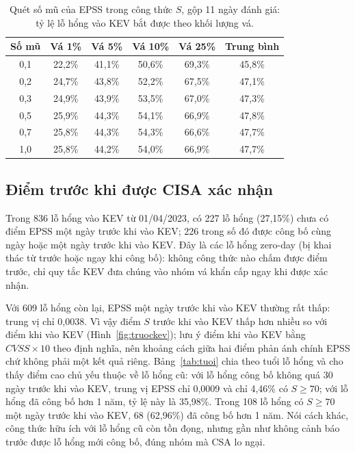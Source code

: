 \documentclass[runningheads]{llncs}
\begin{document}
\begin{table}
\centering
\caption{Quét số mũ của EPSS trong công thức $S$, gộp 11 ngày đánh giá: tỷ lệ lỗ hổng vào KEV bắt
được theo khối lượng vá.}\label{tab:somu}
\begin{tabular}{cccccc}
\toprule
Số mũ & Vá 1\% & Vá 5\% & Vá 10\% & Vá 25\% & Trung bình \\
\midrule
0,1 & 22,2\% & 41,1\% & 50,6\% & 69,3\% & 45,8\% \\
0,2 & 24,7\% & 43,8\% & 52,2\% & 67,5\% & 47,1\% \\
0,3 & 24,9\% & 43,9\% & 53,5\% & 67,0\% & 47,3\% \\
0,5 & 25,9\% & 44,3\% & 54,1\% & 66,9\% & 47,8\% \\
0,7 & 25,8\% & 44,3\% & 54,3\% & 66,6\% & 47,7\% \\
1,0 & 25,8\% & 44,2\% & 54,0\% & 66,9\% & 47,7\% \\
\bottomrule
\end{tabular}
\end{table}

\subsection{Điểm trước khi được CISA xác nhận}

Trong 836 lỗ hổng vào KEV từ 01/04/2023, có 227 lỗ hổng (27,15\%) chưa có điểm EPSS một ngày
trước khi vào KEV; 226 trong số đó được công bố cùng ngày hoặc một ngày trước khi vào KEV.
Đây là các lỗ hổng zero-day (bị khai thác từ trước hoặc ngay khi công bố): không công thức nào chấm được điểm trước, chỉ quy tắc KEV đưa
chúng vào nhóm vá khẩn cấp ngay khi được xác nhận.

Với 609 lỗ hổng còn lại, EPSS một ngày trước khi vào KEV thường rất thấp: trung vị chỉ 0,0038.
Vì vậy điểm $S$ trước khi vào KEV thấp hơn nhiều so với điểm khi vào KEV (Hình~\ref{fig:truockev});
lưu ý điểm khi vào KEV bằng $\mathit{CVSS} \times 10$ theo định nghĩa, nên khoảng cách giữa hai
điểm phản ánh chính EPSS chứ không phải một kết quả riêng. Bảng~\ref{tab:tuoi} chia theo tuổi
lỗ hổng và cho thấy điểm cao chủ yếu thuộc về lỗ hổng cũ: với lỗ hổng công bố không quá 30 ngày
trước khi vào KEV, trung vị EPSS chỉ 0,0009 và chỉ 4,46\% có $S \ge 70$; với lỗ hổng đã công bố
hơn 1 năm, tỷ lệ này là 35,98\%. Trong 108 lỗ hổng có $S \ge 70$ một ngày trước khi vào KEV, 68
(62,96\%) đã công bố hơn 1 năm. Nói cách khác, công thức hữu ích với lỗ hổng cũ còn tồn đọng,
nhưng gần như không cảnh báo trước được lỗ hổng mới công bố, đúng nhóm mà CSA lo ngại.
\end{document}
